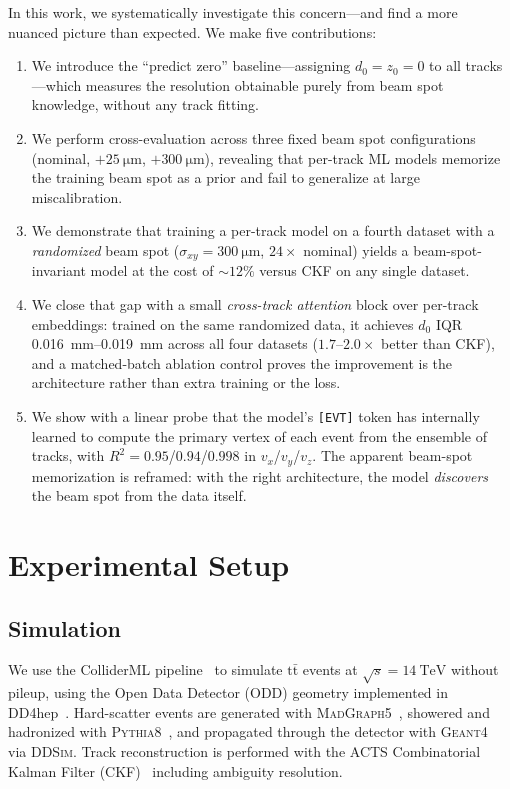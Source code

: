 \documentclass[11pt]{article}
\begin{document}
In this work, we systematically investigate this concern---and find a more nuanced picture than expected.
We make five contributions:
\begin{enumerate}
    \item We introduce the ``predict zero'' baseline---assigning $d_0 = z_0 = 0$ to all tracks---which measures the resolution obtainable purely from beam spot knowledge, without any track fitting.
    \item We perform cross-evaluation across three fixed beam spot configurations (nominal, $+\SI{25}{\micro\metre}$, $+\SI{300}{\micro\metre}$), revealing that per-track ML models memorize the training beam spot as a prior and fail to generalize at large miscalibration.
    \item We demonstrate that training a per-track model on a fourth dataset with a \emph{randomized} beam spot ($\sigma_{xy} = \SI{300}{\micro\metre}$, $24\times$ nominal) yields a beam-spot-invariant model at the cost of $\sim 12\%$ versus CKF on any single dataset.
    \item We close that gap with a small \emph{cross-track attention} block over per-track embeddings: trained on the same randomized data, it achieves $d_0$ IQR \SI{0.016}{\milli\metre}--\SI{0.019}{\milli\metre} across all four datasets ($1.7$--$2.0\times$ better than CKF), and a matched-batch ablation control proves the improvement is the architecture rather than extra training or the loss.
    \item We show with a linear probe that the model's \texttt{[EVT]} token has internally learned to compute the primary vertex of each event from the ensemble of tracks, with $R^2 = 0.95$/$0.94$/$0.998$ in $v_x$/$v_y$/$v_z$. The apparent beam-spot memorization is reframed: with the right architecture, the model \emph{discovers} the beam spot from the data itself.
\end{enumerate}

\section{Experimental Setup}
\label{sec:setup}

\subsection{Simulation}

We use the ColliderML pipeline~\cite{colliderml} to simulate $\text{t}\bar{\text{t}}$ events at $\sqrt{s} = \SI{14}{\TeV}$ without pileup, using the Open Data Detector (ODD) geometry implemented in DD4hep~\cite{dd4hep}.
Hard-scatter events are generated with \textsc{MadGraph5}~\cite{madgraph}, showered and hadronized with \textsc{Pythia8}~\cite{pythia}, and propagated through the detector with \textsc{Geant4}~\cite{geant4} via \textsc{DDSim}.
Track reconstruction is performed with the ACTS Combinatorial Kalman Filter (CKF)~\cite{acts} including ambiguity resolution.
\end{document}
